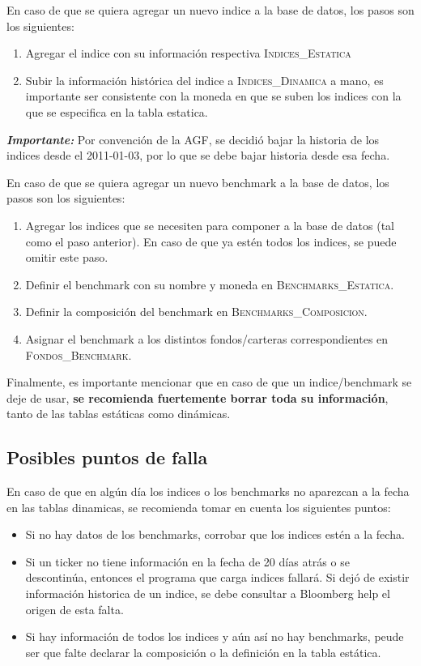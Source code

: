 \documentclass{article}
\begin{document}
En caso de que se quiera agregar un nuevo indice a la base de datos, los pasos son los siguientes:

\begin{enumerate}
\item Agregar el indice con su información respectiva \textsc{Indices\_Estatica}
\item Subir la información histórica del indice a \textsc{Indices\_Dinamica} a mano, es importante ser consistente con la moneda en que se suben los indices con la que se especifica en la tabla estatica.
\end{enumerate}

\emph{\textbf{Importante: }}Por convención de la AGF, se decidió bajar la historia de los indices desde el 2011-01-03, por lo que se debe bajar historia desde esa fecha.
\bigskip

En caso de que se quiera agregar un nuevo benchmark a la base de datos, los pasos son los siguientes:

\begin{enumerate}
\item Agregar los indices que se necesiten para componer a la base de datos (tal como el paso anterior). En caso de que ya estén todos los indices, se puede omitir este paso.
\item Definir el benchmark con su nombre y moneda en \textsc{Benchmarks\_Estatica}.
\item Definir la composición del benchmark en \textsc{Benchmarks\_Composicion}.
\item Asignar el benchmark a los distintos fondos/carteras correspondientes en \textsc{Fondos\_Benchmark}.
\end{enumerate}

Finalmente, es importante mencionar que en caso de que un indice/benchmark se deje de usar, \textbf{se recomienda fuertemente borrar toda su información}, tanto de las tablas estáticas como dinámicas.

\subsection{Posibles puntos de falla}

En caso de que en algún día los indices o los benchmarks no aparezcan a la fecha en las tablas dinamicas, se recomienda tomar en cuenta los siguientes puntos:
\begin{itemize}
\item Si no hay datos de los benchmarks, corrobar que los indices estén a la fecha.
\item Si un ticker no tiene información en la fecha de 20 días atrás o se descontinúa, entonces el programa que carga indices fallará. Si dejó de existir información historica de un indice, se debe consultar a Bloomberg help el origen de esta falta.
\item Si hay información de todos los indices y aún así no hay benchmarks, peude ser que falte declarar la composición o la definición en la tabla estática.
\end{itemize}
\end{document}
